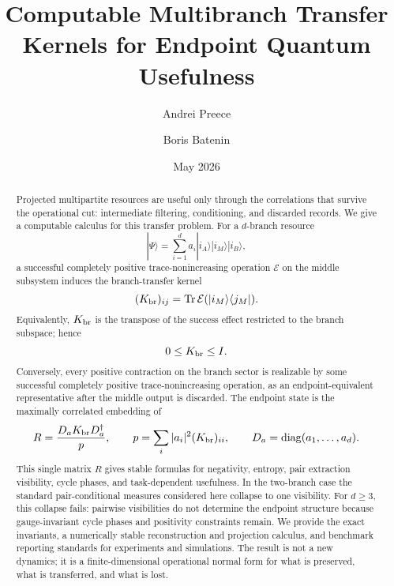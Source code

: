 \documentclass[reprint,aps,pra,superscriptaddress,nofootinbib,longbibliography]{revtex4-2}
\newcommand{\ket}[1]{|#1\rangle}
\newcommand{\bra}[1]{\langle #1|}
\newcommand{\Tr}{\operatorname{Tr}}
\newcommand{\diag}{\operatorname{diag}}
\begin{document}
\title{Computable Multibranch Transfer Kernels for Endpoint Quantum Usefulness}

\author{Andrei Preece}

\author{Boris Batenin}

\date{May 2026}

\begin{abstract}
Projected multipartite resources are useful only through the correlations that survive the operational cut: intermediate filtering, conditioning, and discarded records.  We give a computable calculus for this transfer problem.  For a \(d\)-branch resource
\[
\ket{\Psi}=\sum_{i=1}^d a_i\ket{i_A}\ket{i_M}\ket{i_B},
\]
a successful completely positive trace-nonincreasing operation \(\mathcal E\) on the middle subsystem induces the branch-transfer kernel
\[
(K_{\rm br})_{ij}=\Tr\mathcal E(\ket{i_M}\bra{j_M}).
\]
Equivalently, \(K_{\rm br}\) is the transpose of the success effect restricted to the branch subspace; hence
\[
0\le K_{\rm br}\le I.
\]
Conversely, every positive contraction on the branch sector is realizable by some successful completely positive trace-nonincreasing operation, as an endpoint-equivalent representative after the middle output is discarded.  The endpoint state is the maximally correlated embedding of
\[
R=\frac{D_aK_{\rm br}D_a^\dagger}{p},
\qquad
p=\sum_i |a_i|^2(K_{\rm br})_{ii},
\qquad
D_a=\diag(a_1,\ldots,a_d).
\]
This single matrix \(R\) gives stable formulas for negativity, entropy, pair extraction visibility, cycle phases, and task-dependent usefulness.  In the two-branch case the standard pair-conditional measures considered here collapse to one visibility.  For \(d\ge3\), this collapse fails: pairwise visibilities do not determine the endpoint structure because gauge-invariant cycle phases and positivity constraints remain.  We provide the exact invariants, a numerically stable reconstruction and projection calculus, and benchmark reporting standards for experiments and simulations.  The result is not a new dynamics; it is a finite-dimensional operational normal form for what is preserved, what is transferred, and what is lost.
\end{abstract}

\maketitle
\end{document}
